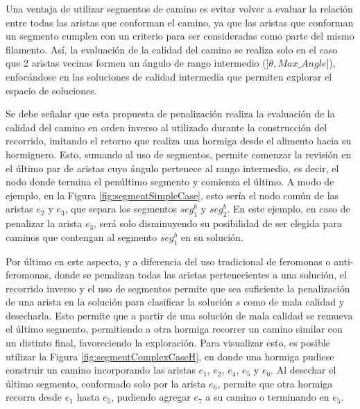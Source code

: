 Una ventaja de utilizar segmentos de camino es evitar volver a evaluar la relaci\'on entre todas las aristas que conforman el camino, ya que las aristas que conforman un segmento cumplen con un criterio para ser consideradas como parte del mismo filamento. As\'i, la evaluaci\'on de la calidad del camino se realiza solo en el caso que 2 aristas vecinas formen un \'angulo de rango intermedio ($]\theta, Max\_Angle]$), enfoc\'andose en las soluciones de calidad intermedia que permiten explorar el espacio de soluciones.


Se debe se\~nalar que esta propuesta de penalizaci\'on realiza la evaluaci\'on de la calidad del camino en orden inverso al utilizado durante la construcci\'on del recorrido, imitando el retorno que realiza una hormiga desde el alimento hacia su hormiguero. Esto, sumando al uso de segmentos, permite comenzar la revisi\'on en el \'ultimo par de aristas cuyo \'angulo pertenece al rango intermedio, es decir, el nodo donde termina el pen\'ultimo segmento y comienza el \'ultimo. A modo de ejemplo, en la Figura \ref{fig:segmentSimpleCase}, esto ser\'ia el nodo com\'un de las aristas $e_2$ y $e_3$, que separa los segmentos $seg^{b}_1$ y $seg^{b}_2$. En este ejemplo, en caso de penalizar la arista $e_3$, ser\'a solo disminuyendo su posibilidad de ser elegida para caminos que contengan al segmento $seg^{b}_1$ en su soluci\'on.



Por \'ultimo en este aspecto, y a diferencia del uso tradicional de feromonas o anti-feromonas, donde se penalizan todas las aristas pertenecientes a una soluci\'on, el recorrido inverso y el uso de segmentos permite que sea suficiente la penalizaci\'on de una arista en la soluci\'on para clasificar la soluci\'on $s$ como de mala calidad y desecharla. Esto permite que a partir de una soluci\'on de mala calidad se remueva el \'ultimo segmento, permitiendo a otra hormiga recorrer un camino similar con un distinto final, favoreciendo la exploraci\'on. Para visualizar esto, es posible utilizar la Figura \ref{fig:segmentComplexCaseH}, en donde una hormiga pudiese construir un camino incorporando las aristas $e_1$, $e_2$, $e_4$, $e_5$ y $e_6$. Al desechar el \'ultimo segmento, conformado solo por la arista $e_6$, permite que otra hormiga recorra desde $e_1$ hasta $e_5$, pudiendo agregar $e_7$ a su camino o terminando en $e_5$. 

